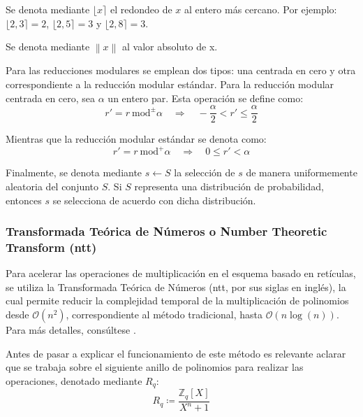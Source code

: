 Se denota mediante \(\lfloor x \rceil\) el redondeo de \(x\) al entero más cercano. Por ejemplo: \(\lfloor 2{,}3 \rceil = 2\), \(\lfloor 2{,}5 \rceil = 3\) y \(\lfloor 2{,}8 \rceil = 3\).
\newline

Se denota mediante $\left\| x\right\|$ al valor absoluto de x.
\newline

Para las reducciones modulares se emplean dos tipos: una centrada en cero y otra correspondiente a la reducción modular estándar. Para la reducción modular centrada en cero, sea \(\alpha\) un entero par. Esta operación se define como:
\begin{equation}
	r' = r \ \text{mod}^{\pm} \alpha \quad \Longrightarrow \quad -\dfrac{\alpha}{2} < r' \le \dfrac{\alpha}{2}
\end{equation}

Mientras que la reducción modular estándar se denota como:
\begin{equation}
	r' = r \ \text{mod}^{+} \alpha \quad \Longrightarrow \quad 0 \le r' < \alpha
\end{equation}

Finalmente, se denota mediante \(s \leftarrow S\) la selección de \(s\) de manera uniformemente aleatoria del conjunto \(S\). Si \(S\) representa una distribución de probabilidad, entonces \(s\) se selecciona de acuerdo con dicha distribución.
\newpage

\subsubsection{Transformada Teórica de Números o Number Theoretic Transform (\gls{ntt})}
Para acelerar las operaciones de multiplicación en el esquema basado en retículas, se utiliza la Transformada Teórica de Números (\gls{ntt}, por sus siglas en inglés), la cual permite reducir la complejidad temporal de la multiplicación de polinomios desde \(\mathcal{O}(n^2)\), correspondiente al método tradicional, hasta \(\mathcal{O}(n \log(n))\). Para más detalles, consúltese \cite{cryptoeprint:2024/585}.
\newline

Antes de pasar a explicar el funcionamiento de este método es relevante aclarar que se trabaja sobre el siguiente anillo de polinomios para realizar las operaciones, denotado mediante \(R_q\):
\begin{equation}
	R_q \coloneqq \dfrac{\mathbb{Z}_q[X]}{X^n + 1}
\end{equation}

